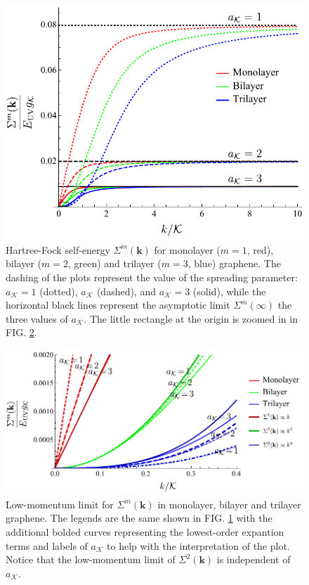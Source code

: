 \documentclass[english,aps,prd,nofootinbib,twocolumn]{revtex4-1}
\begin{document}
\begin{figure}[h]
\centering
\includegraphics[scale=0.6]{SelfEnergyPlot123.pdf}
\caption{Hartree-Fock self-energy $\Sigma^{m}(\mathbf{k})$ for monolayer ($m=1$, red), bilayer ($m=2$, green) and trilayer ($m=3$, blue) graphene. The dashing of the plots represent the value of the spreading parameter: $a_{\mathcal{K}}=1$ (dotted), $a_{\mathcal{K}}$ (dashed), and $a_{\mathcal{K}}=3$ (solid), while the horizontal black lines represent the asymptotic limit $\Sigma^{m}(\infty)$ the three values of $a_{\mathcal{K}}$. The little rectangle at the origin is zoomed in in FIG. \ref{fig:Multilayer-Self-Energies-Taylor}.}
\label{fig:Multilayer-Self-Energies}
\end{figure}
\begin{figure}[h]
\centering
\includegraphics[scale=0.6]{SelfEnergyPlot123Taylor.pdf}
\caption{Low-momentum limit for $\Sigma^{m}(\mathbf{k})$ in monolayer, bilayer and trilayer graphene. The legends are the same shown in FIG. \ref{fig:Multilayer-Self-Energies} with the additional bolded curves representing the lowest-order expantion terms and labels of $a_{\mathcal{K}}$ to help with the interpretation of the plot. Notice that the low-momentum limit of $\Sigma^{2}(\mathbf{k})$ is independent of $a_{\mathcal{K}}$.}
\label{fig:Multilayer-Self-Energies-Taylor}
\end{figure}
\end{document}
